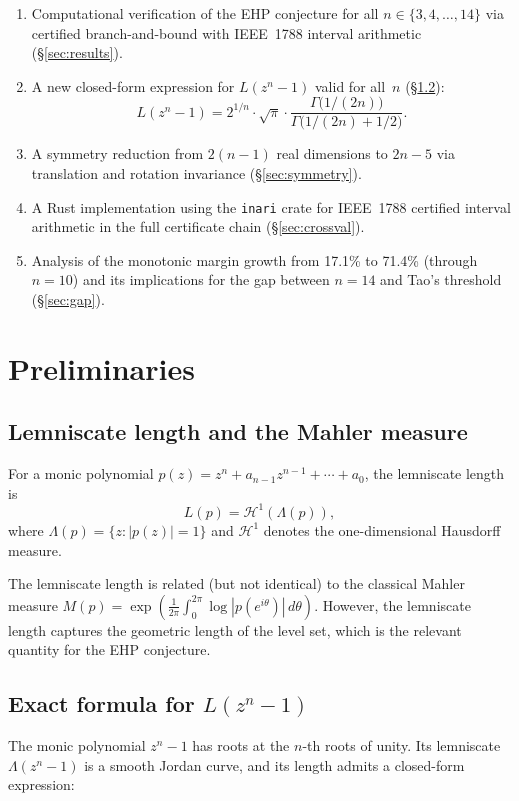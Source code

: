 \documentclass[11pt]{article}
\theoremstyle{plain}
\theoremstyle{definition}
\theoremstyle{remark}
\begin{document}
\begin{enumerate}[nosep]
\item Computational verification of the EHP conjecture for all $n \in \{3, 4, \ldots, 14\}$ via certified branch-and-bound with IEEE~1788 interval arithmetic (\S\ref{sec:results}).
\item A new closed-form expression for $L(z^n - 1)$ valid for all~$n$ (\S\ref{sec:formula}):
\[
L(z^n - 1) = 2^{1/n} \cdot \sqrt{\pi} \cdot \frac{\Gamma\bigl(1/(2n)\bigr)}{\Gamma\bigl(1/(2n) + 1/2\bigr)}.
\]
\item A symmetry reduction from $2(n-1)$ real dimensions to $2n-5$ via translation and rotation invariance (\S\ref{sec:symmetry}).
\item A Rust implementation using the \texttt{inari} crate for IEEE~1788 certified interval arithmetic in the full certificate chain (\S\ref{sec:crossval}).
\item Analysis of the monotonic margin growth from 17.1\% to 71.4\% (through $n=10$) and its implications for the gap between $n = 14$ and Tao's threshold (\S\ref{sec:gap}).
\end{enumerate}

\section{Preliminaries}

\subsection{Lemniscate length and the Mahler measure}

For a monic polynomial $p(z) = z^n + a_{n-1}z^{n-1} + \cdots + a_0$, the lemniscate length is
\[
L(p) = \mathcal{H}^1(\Lambda(p)),
\]
where $\Lambda(p) = \{z : |p(z)| = 1\}$ and $\mathcal{H}^1$ denotes the one-dimensional Hausdorff measure.

The lemniscate length is related (but not identical) to the classical Mahler measure $M(p) = \exp\!\left(\frac{1}{2\pi}\int_0^{2\pi} \log|p(e^{i\theta})|\,d\theta\right)$. However, the lemniscate length captures the geometric length of the level set, which is the relevant quantity for the EHP conjecture.

\subsection{Exact formula for $L(z^n - 1)$}
\label{sec:formula}

The monic polynomial $z^n - 1$ has roots at the $n$-th roots of unity. Its lemniscate $\Lambda(z^n - 1)$ is a smooth Jordan curve, and its length admits a closed-form expression:
\end{document}
